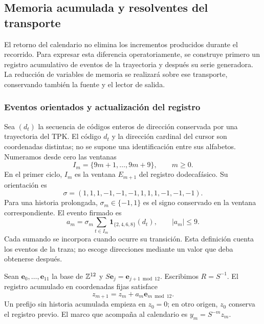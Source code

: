 \subsection{Memoria acumulada y resolventes del transporte}
\label{subsec:memoria-resolvente}

El retorno del calendario no elimina los incrementos producidos durante
el recorrido. Para expresar esta diferencia operatoriamente, se construye
primero un registro acumulativo de eventos de la trayectoria y después su
serie generadora. La reducción de variables de memoria se realizará sobre
ese transporte, conservando también la fuente y el lector de salida.

\subsubsection{Eventos orientados y actualización del registro}

Sea \((d_t)\) la secuencia de códigos enteros de dirección conservada
por una trayectoria del TPK. El código \(d_t\) y la dirección cardinal
del cursor son coordenadas distintas; no se supone una identificación
entre sus alfabetos. Numeramos desde cero las ventanas
\[
 I_m=\{9m+1,\ldots,9m+9\},\qquad m\geq0.
\]
En el primer ciclo, \(I_m\) es la ventana \(E_{m+1}\) del registro
dodecafásico. Su orientación es
\[
 \sigma=(1,1,1,-1,-1,-1,1,1,1,-1,-1,-1).
\]
Para una historia prolongada, \(\sigma_m\in\{-1,1\}\) es el signo
conservado en la ventana correspondiente. El evento firmado es
\begin{equation}
 a_m=\sigma_m\sum_{t\in I_m}
       \mathbf1_{\{2,4,6,8\}}(d_t),\qquad |a_m|\leq9.
 \label{mem:evento}
\end{equation}
Cada sumando se incorpora cuando ocurre su transición. Esta definición
cuenta los eventos de la traza; no escoge direcciones mediante un valor
que deba obtenerse después.

Sean \(\mathbf e_0,\ldots,\mathbf e_{11}\) la base de \(\mathbb Z^{12}\)
y \(S\mathbf e_j=\mathbf e_{j+1\bmod12}\). Escribimos
\(R=S^{-1}\). El registro acumulado en coordenadas fijas satisface
\[
z_{m+1}=z_m+a_m\mathbf e_{m\bmod12}.
\]
Un prefijo sin historia acumulada empieza en \(z_0=0\); en otro
origen, \(z_0\) conserva el registro previo.
El marco que acompaña al calendario es \(y_m=S^{-m}z_m\).

